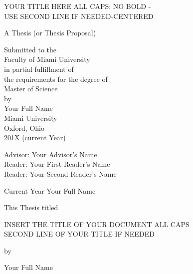 \documentclass[12pt, oneside]{book2}
\begin{document}
\begin{titlepage}
\begin{center}

    YOUR TITLE HERE ALL CAPS; NO BOLD - \\USE SECOND LINE IF NEEDED-CENTERED

    \vspace{1.5cm}

    A Thesis (or Thesis Proposal) \\

    \vspace{0.5cm}

    Submitted to the \\
    Faculty of Miami University \\
    in partial fulfillment of \\
    the requirements for the degree of \\
    Master of Science \\
    by \\
    Your Full Name \\
    Miami University \\
    Oxford, Ohio \\
    201X (current Year)

    \vspace{1.5cm}

    Advisor: Your Advisor's Name\\
    Reader: Your First Reader's Name\\
    Reader: Your Second Reader's Name\\

    \vspace{1.5cm}

    \textcopyright Current Year Your Full Name

    \newpage

    This Thesis titled

    \vspace{1.0cm}

    INSERT THE TITLE OF YOUR DOCUMENT ALL CAPS \\SECOND LINE OF YOUR TITLE IF NEEDED

    \vspace{1.0cm}

    by

    \vspace{1.0cm}

    Your Full Name

    \vspace{1.0cm}


\end{center}
\end{titlepage}
\end{document}
